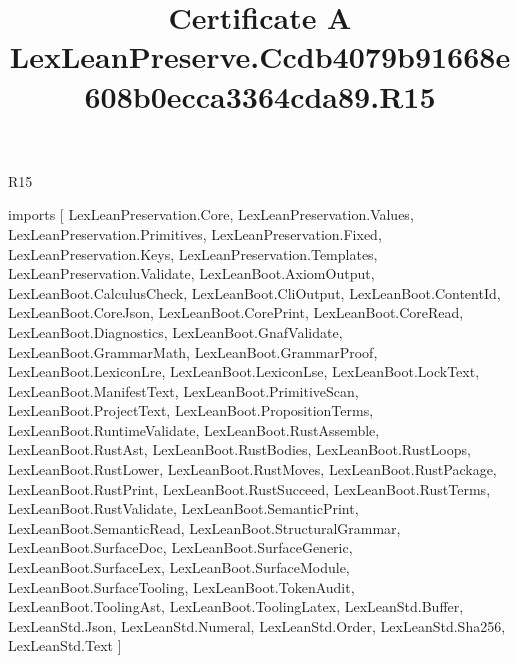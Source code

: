 \begin{lexlean}{R15}
\title{Certificate A LexLeanPreserve.Ccdb4079b91668e608b0ecca3364cda89.R15}
\begin{coremodule}
imports [
  LexLeanPreservation.Core,
  LexLeanPreservation.Values,
  LexLeanPreservation.Primitives,
  LexLeanPreservation.Fixed,
  LexLeanPreservation.Keys,
  LexLeanPreservation.Templates,
  LexLeanPreservation.Validate,
  LexLeanBoot.AxiomOutput,
  LexLeanBoot.CalculusCheck,
  LexLeanBoot.CliOutput,
  LexLeanBoot.ContentId,
  LexLeanBoot.CoreJson,
  LexLeanBoot.CorePrint,
  LexLeanBoot.CoreRead,
  LexLeanBoot.Diagnostics,
  LexLeanBoot.GnafValidate,
  LexLeanBoot.GrammarMath,
  LexLeanBoot.GrammarProof,
  LexLeanBoot.LexiconLre,
  LexLeanBoot.LexiconLse,
  LexLeanBoot.LockText,
  LexLeanBoot.ManifestText,
  LexLeanBoot.PrimitiveScan,
  LexLeanBoot.ProjectText,
  LexLeanBoot.PropositionTerms,
  LexLeanBoot.RuntimeValidate,
  LexLeanBoot.RustAssemble,
  LexLeanBoot.RustAst,
  LexLeanBoot.RustBodies,
  LexLeanBoot.RustLoops,
  LexLeanBoot.RustLower,
  LexLeanBoot.RustMoves,
  LexLeanBoot.RustPackage,
  LexLeanBoot.RustPrint,
  LexLeanBoot.RustSucceed,
  LexLeanBoot.RustTerms,
  LexLeanBoot.RustValidate,
  LexLeanBoot.SemanticPrint,
  LexLeanBoot.SemanticRead,
  LexLeanBoot.StructuralGrammar,
  LexLeanBoot.SurfaceDoc,
  LexLeanBoot.SurfaceGeneric,
  LexLeanBoot.SurfaceLex,
  LexLeanBoot.SurfaceModule,
  LexLeanBoot.SurfaceTooling,
  LexLeanBoot.TokenAudit,
  LexLeanBoot.ToolingAst,
  LexLeanBoot.ToolingLatex,
  LexLeanStd.Buffer,
  LexLeanStd.Json,
  LexLeanStd.Numeral,
  LexLeanStd.Order,
  LexLeanStd.Sha256,
  LexLeanStd.Text
]


\end{coremodule}
\end{lexlean}

